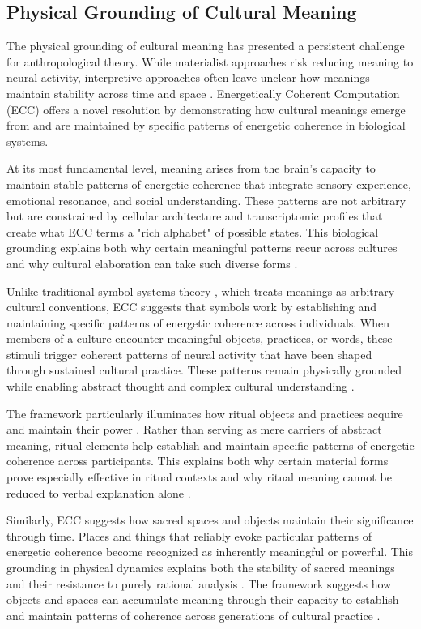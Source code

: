 \subsection{Physical Grounding of Cultural Meaning}

The physical grounding of cultural meaning has presented a persistent challenge for anthropological theory. While materialist approaches risk reducing meaning to neural activity, interpretive approaches often leave unclear how meanings maintain stability across time and space \cite{dandrade1995development}. Energetically Coherent Computation (ECC) offers a novel resolution by demonstrating how cultural meanings emerge from and are maintained by specific patterns of energetic coherence in biological systems.

At its most fundamental level, meaning arises from the brain's capacity to maintain stable patterns of energetic coherence that integrate sensory experience, emotional resonance, and social understanding. These patterns are not arbitrary but are constrained by cellular architecture and transcriptomic profiles that create what ECC terms a "rich alphabet" of possible states. This biological grounding explains both why certain meaningful patterns recur across cultures and why cultural elaboration can take such diverse forms \cite{bloch2012anthropology}.

Unlike traditional symbol systems theory \cite{harnad1990symbol}, which treats meanings as arbitrary cultural conventions, ECC suggests that symbols work by establishing and maintaining specific patterns of energetic coherence across individuals. When members of a culture encounter meaningful objects, practices, or words, these stimuli trigger coherent patterns of neural activity that have been shaped through sustained cultural practice. These patterns remain physically grounded while enabling abstract thought and complex cultural understanding \cite{lakoff1999philosophy}.

The framework particularly illuminates how ritual objects and practices acquire and maintain their power \cite{bell1992ritual}. Rather than serving as mere carriers of abstract meaning, ritual elements help establish and maintain specific patterns of energetic coherence across participants. This explains both why certain material forms prove especially effective in ritual contexts and why ritual meaning cannot be reduced to verbal explanation alone \cite{turner1967forest}.

Similarly, ECC suggests how sacred spaces and objects maintain their significance through time. Places and things that reliably evoke particular patterns of energetic coherence become recognized as inherently meaningful or powerful. This grounding in physical dynamics explains both the stability of sacred meanings and their resistance to purely rational analysis \cite{eliade1959sacred}. The framework suggests how objects and spaces can accumulate meaning through their capacity to establish and maintain patterns of coherence across generations of cultural practice \cite{keane2003semiotics}.

